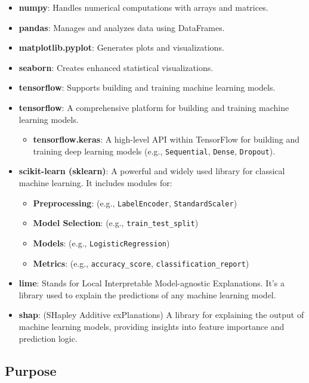 \documentclass[
  letterpaper,
  DIV=11,
  numbers=noendperiod]{scrartcl}
\providecommand{\tightlist}{%
  \setlength{\itemsep}{0pt}\setlength{\parskip}{0pt}}
\begin{document}
\begin{itemize}
\tightlist
\item
  \textbf{numpy}: Handles numerical computations with arrays and
  matrices.
\item
  \textbf{pandas}: Manages and analyzes data using DataFrames.
\item
  \textbf{matplotlib.pyplot}: Generates plots and visualizations.
\item
  \textbf{seaborn}: Creates enhanced statistical visualizations.
\item
  \textbf{tensorflow}: Supports building and training machine learning
  models.
\item
  \textbf{tensorflow}: A comprehensive platform for building and
  training machine learning models.

  \begin{itemize}
  \tightlist
  \item
    \textbf{tensorflow.keras}: A high-level API within TensorFlow for
    building and training deep learning models (e.g.,
    \texttt{Sequential}, \texttt{Dense}, \texttt{Dropout}).
  \end{itemize}
\item
  \textbf{scikit-learn (sklearn)}: A powerful and widely used library
  for classical machine learning. It includes modules for:

  \begin{itemize}
  \tightlist
  \item
    \textbf{Preprocessing}: (e.g., \texttt{LabelEncoder},
    \texttt{StandardScaler})
  \item
    \textbf{Model Selection}: (e.g., \texttt{train\_test\_split})
  \item
    \textbf{Models}: (e.g., \texttt{LogisticRegression})
  \item
    \textbf{Metrics}: (e.g., \texttt{accuracy\_score},
    \texttt{classification\_report})
  \end{itemize}
\item
  \textbf{lime}: Stands for Local Interpretable Model-agnostic
  Explanations. It's a library used to explain the predictions of any
  machine learning model.
\item
  \textbf{shap}: (SHapley Additive exPlanations) A library for
  explaining the output of machine learning models, providing insights
  into feature importance and prediction logic.
\end{itemize}

\subsection{Purpose}\label{purpose}
\end{document}
